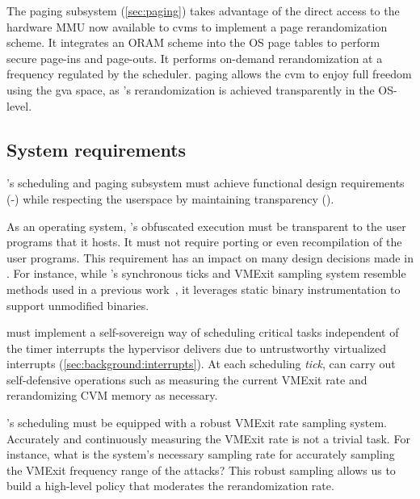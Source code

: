 The paging subsystem (\cref{sec:paging}) takes advantage of the direct access to the hardware MMU now available to \glspl{cvm} to implement a page rerandomization scheme.
It integrates an ORAM scheme into the OS page tables to perform secure page-ins and page-outs.
It performs on-demand rerandomization at a frequency regulated by the scheduler.
\thename paging allows the \gls{cvm} to enjoy full freedom using the \gls{gva} space, as \thename's rerandomization is achieved transparently in the OS-level.



\subsection{System requirements}
\thename's scheduling and paging subsystem must achieve functional design requirements (\reqsovereign-\reqfullsystem) while respecting the userspace by maintaining transparency (\reqtransparent).
\vspace{0.1em}





 As an operating system, \thename's obfuscated execution must be transparent to the user programs that it hosts.
It must not require porting or even recompilation of the user programs.
This requirement has an impact on many design decisions made in \thename.
For instance, while \thename's synchronous ticks and VMExit sampling system resemble methods used in a previous work~\cite{oleksenko2018varys}, it leverages static binary instrumentation to support unmodified binaries.


 \thename must implement a self-sovereign way of scheduling critical tasks independent of the timer interrupts the hypervisor delivers due to untrustworthy virtualized interrupts (\cref{sec:background:interrupts}).
At each scheduling \emph{tick}, \thename can carry out self-defensive operations such as measuring the current VMExit rate and rerandomizing CVM memory as necessary.


 \thename's scheduling must be equipped with a robust VMExit rate sampling system.
Accurately and continuously measuring the VMExit rate is not a trivial task.
For instance, what is the system's necessary sampling rate for accurately sampling the VMExit frequency range of the attacks?
This robust sampling allows us to build a high-level policy that moderates the rerandomization rate.

